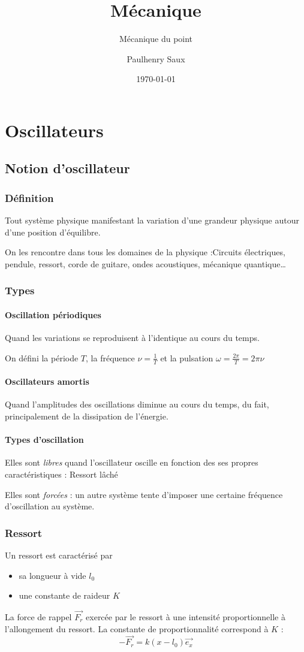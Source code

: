 \documentclass[french]{yLectureNote}
\title{Mécanique}
\subtitle{Mécanique du point}
\author{Paulhenry Saux}
\date{\today}
\renewcommand{\vec}{\overrightarrow}
\begin{document}
\setcounter{chapter}{5}
	\chapter{Oscillateurs}
	\section{Notion d'oscillateur}
	\subsection{Définition}
Tout système physique manifestant la variation d'une grandeur physique autour d'une position d'équilibre.

On les rencontre dans tous les domaines de la physique :Circuits électriques, pendule, ressort, corde de guitare, ondes acoustiques, mécanique quantique\dots
\subsection{Types}
\subsubsection{Oscillation périodiques}
Quand les variations se reproduisent à l'identique au cours du temps.

On défini la période $T$, la fréquence $\nu = \frac{1}{T}$ et la pulsation $\omega = \frac{2\pi}{T} = 2\pi\nu$
\subsubsection{Oscillateurs amortis}
Quand l'amplitudes des oscillations diminue au cours du temps, du fait, principalement de la dissipation de l'énergie.
\subsubsection{Types d'oscillation}
Elles sont \emph{libres} quand l'oscillateur oscille en fonction des ses propres caractéristiques : Ressort l\^aché

Elles sont \emph{forcées} : un autre système tente d'imposer une certaine fréquence d'oscillation au système.
\subsection{Ressort}
Un ressort est caractérisé par
\begin{itemize}
 \item sa longueur à vide $l_0$
 \item une constante de raideur $K$
\end{itemize}
La force de rappel $\vec{F_r}$ exercée par le ressort à une intensité proportionnelle à l'allongement du ressort. La constante de proportionnalité correspond à $K$ :
\[ - \vec{F_r} = k(x-l_0)\vec{e_x}\]
\end{document}
